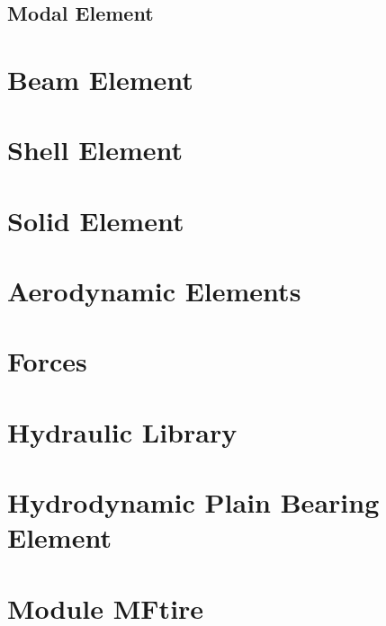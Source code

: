 \documentclass[10pt,fleqn,subeqn]{report}
\begin{document}








\section{Modal Element}
\label{sec:modal-element}




\chapter{Beam Element}




\chapter{Shell Element}


\chapter{Solid Element}


\chapter{Aerodynamic Elements}





\chapter{Forces}




\chapter{Hydraulic Library}


\chapter{Hydrodynamic Plain Bearing Element}


\chapter{Module MFtire}

\end{document}
